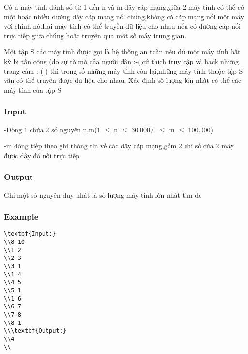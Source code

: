 



   Có n máy tính đánh số từ 1 đến n và m dây cáp mạng,giữa 2 máy tính có thể có một hoặc nhiều đường dây cáp mạng nối chúng,không có cáp mạng nối một máy với chính nó.Hai máy tính có thể truyền dữ liệu cho nhau nếu có đường cáp nối trực tiếp giữa chúng hoặc truyền qua một số máy trung gian.  

   Một tập S các máy tính được gọi là hệ thống an toàn nếu dù một máy tính bất kỳ bị tấn công (do sự tò mò của người dân :-(,cứ thích truy cập và hack những trang cấm :-( ) thì trong số những máy tính còn lại,những máy tính thuộc tập S vẫn có thể truyền được dữ liệu cho nhau. Xác định số lượng lớn nhất có thể các máy tính của tập S  

\subsubsection{   Input  }

   -Dòng 1 chứa 2 số nguyên n,m(1 $\le$ n $\le$ 30.000,0 $\le$ m $\le$ 100.000)  

   -m dòng tiếp theo ghi thông tin về các dây cáp mạng,gồm 2 chỉ số của 2 máy được dây đó nối trực tiếp  

\subsubsection{   Output  }

   Ghi một số nguyên duy nhất là số lượng máy tính lớn nhất tìm đc  

\subsubsection{   Example  }
\begin{verbatim}
\textbf{Input:}
\\8 10
\\1 2
\\2 3
\\3 1
\\1 4
\\4 5
\\5 1
\\1 6
\\6 7
\\7 8
\\8 1
\\\textbf{Output:}
\\4
\\\end{verbatim}

